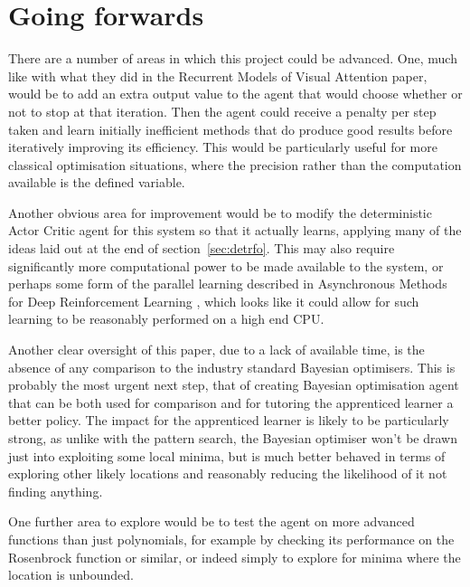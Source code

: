 \section{Going forwards}
There are a number of areas in which this project could be advanced. One, much like with what they did in the Recurrent Models of Visual Attention paper\cite{RVA}, would be to add an extra output value to the agent that would choose whether or not to stop at that iteration. Then the agent could receive a penalty per step taken and learn initially inefficient methods that do produce good results before iteratively improving its efficiency. This would be particularly useful for more classical optimisation situations, where the precision rather than the computation available is the defined variable.

Another obvious area for improvement would be to modify the deterministic Actor Critic agent for this system so that it actually learns, applying many of the ideas laid out at the end of section~\ref{sec:detrfo}. This may also require significantly more computational power to be made available to the system, or perhaps some form of the parallel learning described in Asynchronous Methods for Deep Reinforcement Learning \cite{mnih2016asynchronous}, which looks like it could allow for such learning to be reasonably performed on a high end CPU.

Another clear oversight of this paper, due to a lack of available time, is the absence of any comparison to the industry standard Bayesian optimisers. This is probably the most urgent next step, that of creating Bayesian optimisation agent that can be both used for comparison and for tutoring the apprenticed learner a better policy. The impact for the apprenticed learner is likely to be particularly strong, as unlike with the pattern search, the Bayesian optimiser won't be drawn just into exploiting some local minima, but is much better behaved in terms of exploring other likely locations and reasonably reducing the likelihood of it not finding anything.


One further area to explore would be to test the agent on more advanced functions than just polynomials, for example by checking its performance on the Rosenbrock function or similar, or indeed simply to explore for minima where the location is unbounded.
